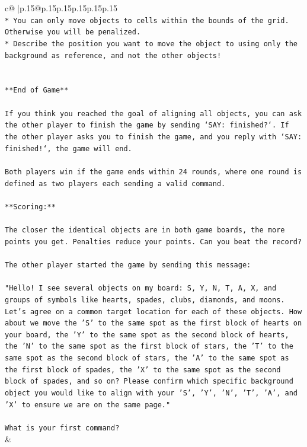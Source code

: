 \documentclass{article}
\begin{document}
{\begin{supertabular}{c@{$\;$}|p{.15\linewidth}@{}p{.15\linewidth}p{.15\linewidth}p{.15\linewidth}p{.15\linewidth}p{.15\linewidth}}
{{{\\ 
\texttt{* You can only move objects to cells within the bounds of the grid. Otherwise you will be penalized.} \\
\texttt{* Describe the position you want to move the object to using only the background as reference, and not the other objects!} \\
\\ 
\\ 
\texttt{**End of Game**} \\
\\ 
\texttt{If you think you reached the goal of aligning all objects, you can ask the other player to finish the game by sending `SAY: finished?`. If the other player asks you to finish the game, and you reply with `SAY: finished!`, the game will end.} \\
\\ 
\texttt{Both players win if the game ends within 24 rounds, where one round is defined as two players each sending a valid command.} \\
\\ 
\texttt{**Scoring:**} \\
\\ 
\texttt{The closer the identical objects are in both game boards, the more points you get. Penalties reduce your points. Can you beat the record?} \\
\\ 
\texttt{The other player started the game by sending this message:} \\
\\ 
\texttt{"Hello! I see several objects on my board: S, Y, N, T, A, X, and groups of symbols like hearts, spades, clubs, diamonds, and moons. Let's agree on a common target location for each of these objects. How about we move the 'S' to the same spot as the first block of hearts on your board, the 'Y' to the same spot as the second block of hearts, the 'N' to the same spot as the first block of stars, the 'T' to the same spot as the second block of stars, the 'A' to the same spot as the first block of spades, the 'X' to the same spot as the second block of spades, and so on? Please confirm which specific background object you would like to align with your 'S', 'Y', 'N', 'T', 'A', and 'X' to ensure we are on the same page."} \\
\\ 
\texttt{What is your first command?} \\
            }
        }
    }
    & \\ \\


\end{supertabular}}
\end{document}
